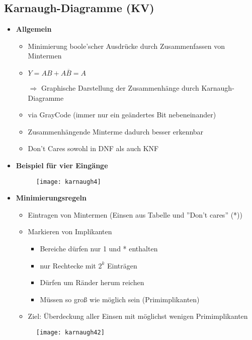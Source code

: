 \subsection{Karnaugh-Diagramme (KV)}
\begin{itemize}

\item \textbf{Allgemein}
	\begin{itemize}
	\item Minimierung boole'scher Ausdrücke durch Zusammenfassen von Mintermen
	\item $Y = AB +A\overline{B}= A$
	\item[$\Rightarrow$] Graphische Darstellung der Zusammenhänge durch Karnaugh-Diagramme
	\item via GrayCode (immer nur ein geändertes Bit nebeneinander)
	\item Zusammenhängende Minterme dadurch besser erkennbar
	\item Don't Cares sowohl in DNF als auch KNF
	\end{itemize}

\item \textbf{Beispiel für vier Eingänge}
	\item[] \begin{figure}[H]
				\begin{center}
				\texttt{[image: karnaugh4]}
				\end{center}
			\end{figure}
			
\item \textbf{Minimierungsregeln}
	\begin{itemize}
	\item Eintragen von Mintermen (Einsen aus Tabelle und ''Don't cares'' (*))
	\item Markieren von Implikanten
		\begin{itemize}
		\item Bereiche dürfen nur 1 und * enthalten
		\item nur Rechtecke mit $2^k$ Einträgen
		\item Dürfen um Ränder herum reichen
		\item Müssen so groß wie möglich sein (Primimplikanten)
		\end{itemize}
	\item Ziel: Überdeckung aller Einsen mit möglichst wenigen Primimplikanten
	\end{itemize}
	\item[] \begin{figure}[H]
				\begin{center}
				\texttt{[image: karnaugh42]}
				\end{center}
			\end{figure}
			


\end{itemize}

